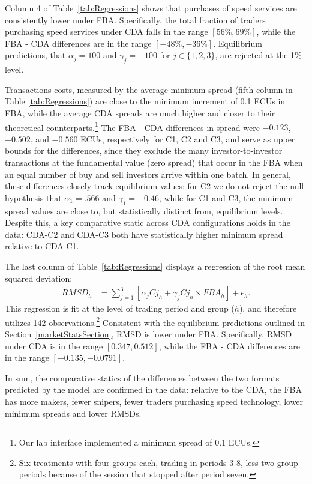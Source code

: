 \documentclass[12pt]{article}
\begin{document}
Column 4 of Table~\ref{tab:Regressions} shows that purchases of speed services are consistently lower under FBA. Specifically, the total fraction of traders purchasing speed services under CDA falls in the range $[56\%,69\%]$, while the FBA - CDA differences are in the range $[-48\%, -36\%]$. Equilibrium predictions, that $\alpha_j=100$ and $\gamma_j=-100$ for $j\in\{1,2,3\}$, are rejected at the 1\% level.

Transactions costs, measured by the average minimum spread (fifth column in Table \ref{tab:Regressions}) are close to the minimum increment of 0.1 ECUs in FBA, while the average CDA spreads are much higher and closer to their theoretical counterparts.\footnote{Our lab interface implemented a minimum spread of 0.1 ECUs.} The FBA - CDA differences in spread were $-0.123$,  $-0.502$, and $-0.560$ ECUs, respectively for C1, C2 and C3, and serve as upper bounds for the differences, since they exclude the many investor-to-investor transactions at the fundamental value (zero spread) that occur in the FBA when an equal number of buy and sell investors arrive within one batch.
In general, these differences closely track equilibrium values: for C2 we do not reject the null hypothesis that $\alpha_1=.566$ and $\gamma_1=-0.46$, while for C1 and C3, the minimum spread values are close to, but statistically distinct from, equilibrium levels.
Despite this, a key comparative static across CDA configurations holds in the data: CDA-C2 and CDA-C3 both have statistically higher minimum spread relative to CDA-C1. 

The last column of Table~\ref{tab:Regressions} displays a regression of the root mean squared deviation:
\begin{align} \label{eq:RegSpecRMSD}
RMSD_h & = \sum_{j=1}^{3} \left[ \alpha_j Cj_{h} + \gamma_j  Cj_{h} \times FBA_{h}   \right]  + \epsilon_{h}.
\end{align}
This regression is fit at the level of trading period and group ($h$), and therefore utilizes 142 observations.\footnote{Six treatments with four groups each, trading in periods 3-8, less two group-periods because of the session that stopped after period seven.} 
Consistent with the equilibrium predictions outlined in Section~\ref{marketStatsSection}, RMSD is lower under FBA. Specifically, RMSD under CDA is in the range $[0.347,0.512]$, while the FBA - CDA differences are in the range $[-0.135, -0.0791]$. 

In sum, the comparative statics of the differences between the two formats predicted by the model are confirmed in the data: relative to the CDA, the FBA has more makers, fewer snipers, fewer traders purchasing speed technology, lower minimum spreads and lower RMSDs.
\end{document}
